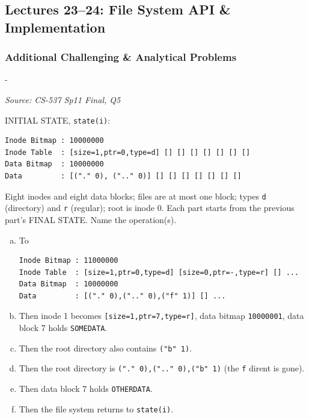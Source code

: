 \documentclass[11pt,a4paper]{article}
\makeatletter
\newcommand{\keepspace}[1]{\par\penalty-100\begingroup
  \setlength{\dimen@}{#1}\dimen@ii\pagegoal\advance\dimen@ii-\pagetotal
  \ifdim\dimen@>\dimen@ii\ifdim\dimen@ii>\z@\vfil\fi\break\fi\endgroup}
\newcounter{qn}[section]
\newenvironment{Qn}[4]{%
  \refstepcounter{qn}\keepspace{7\baselineskip}%
  \begin{tcolorbox}[qboxstyle, title={Q\thesection.\theqn\ \ [#1 \textbar\ #2]\ \ #4}]%
  {\footnotesize\color{g3}\textit{Source: #3}}\par\smallskip%
}{%
  \end{tcolorbox}%
}
\makeatother
\begin{document}
\subsection{Lectures 23--24: File System API \& Implementation}

\subsubsection*{Additional Challenging \& Analytical Problems}

\begin{Qn}{Hard}{Lect 24}{CS-537 Sp11 Final, Q5}{Black-box VSFS: recover the operation sequence}
INITIAL STATE, \texttt{state(i)}:
\begin{lstlisting}[numbers=none]
Inode Bitmap : 10000000
Inode Table  : [size=1,ptr=0,type=d] [] [] [] [] [] [] []
Data Bitmap  : 10000000
Data         : [("." 0), (".." 0)] [] [] [] [] [] [] []
\end{lstlisting}
Eight inodes and eight data blocks; files are at most one block; types
\texttt{d} (directory) and \texttt{r} (regular); root is inode 0. Each
part starts from the previous part's FINAL STATE. Name the operation(s).
\begin{enumerate}[(a)]
\item To
\begin{lstlisting}[numbers=none]
Inode Bitmap : 11000000
Inode Table  : [size=1,ptr=0,type=d] [size=0,ptr=-,type=r] [] ...
Data Bitmap  : 10000000
Data         : [("." 0),(".." 0),("f" 1)] [] ...
\end{lstlisting}
\item Then inode 1 becomes \texttt{[size=1,ptr=7,type=r]}, data bitmap
      \texttt{10000001}, data block 7 holds \texttt{SOMEDATA}.
\item Then the root directory also contains \texttt{("b" 1)}.
\item Then the root directory is
      \texttt{("." 0),(".." 0),("b" 1)} (the \texttt{f} dirent is gone).
\item Then data block 7 holds \texttt{OTHERDATA}.
\item Then the file system returns to \texttt{state(i)}.
\end{enumerate}
\end{Qn}
\end{document}
